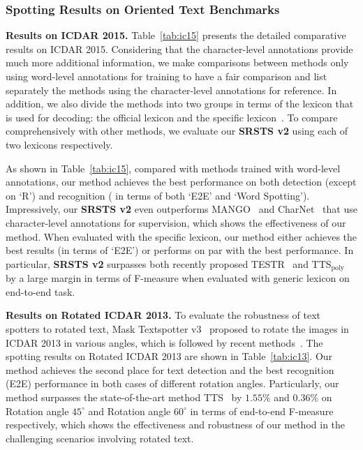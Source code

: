 \subsubsection{Spotting Results on Oriented Text Benchmarks}
\smallskip\noindent\textbf{Results on ICDAR 2015.}
Table~\ref{tab:ic15} presents the detailed comparative results on ICDAR 2015. Considering that the character-level annotations provide much more additional information, we make comparisons between methods only using word-level annotations for training to have a fair comparison and list separately the methods using the character-level annotations for reference. In addition, we also divide the methods into two groups in terms of the lexicon that is used for decoding: the official lexicon and the specific lexicon~\cite{liao2019mask}. To compare comprehensively with other methods, we evaluate our \textbf{SRSTS v2} using each of two lexicons respectively.

As shown in Table~\ref{tab:ic15}, compared with methods trained with word-level annotations, our method achieves the best performance on both detection (except on `R') and recognition ( in terms of both `E2E' and `Word Spotting'). Impressively, our \textbf{SRSTS v2} even outperforms MANGO~\cite{qiao2020mango} and CharNet~\cite{xing2019convolutional} that use character-level annotations for supervision, which shows the effectiveness of our method. When evaluated with the specific lexicon, our method either achieves the best results (in terms of `E2E') or performs on par with the best performance. In particular, \textbf{SRSTS v2} surpasses both recently proposed TESTR~\cite{zhang2022text} and TTS$_{\text{poly}}$~\cite{kittenplon2022towards} by a large margin in terms of F-measure when evaluated with generic lexicon on end-to-end task.



\smallskip\noindent\textbf{Results on Rotated ICDAR 2013.} To evaluate the robustness of text spotters to rotated text, Mask Textspotter v3~\cite{liao2020mask} proposed to rotate the images in ICDAR 2013 in various angles, which is followed by recent methods~\cite{huang2022swintextspotter, kittenplon2022towards}. The spotting results on Rotated ICDAR 2013 are shown in Table~\ref{tab:ic13}. Our method achieves the second place for text detection and the best recognition (E2E) performance in both cases of different rotation angles. Particularly, our method surpasses the state-of-the-art method TTS~\cite{kittenplon2022towards} by $1.55\%$ and $0.36\%$ on Rotation angle ${45}^{\circ}$ and Rotation angle ${60}^{\circ}$ in terms of end-to-end F-measure respectively, which shows the effectiveness and robustness of our method in the challenging scenarios involving rotated text.


